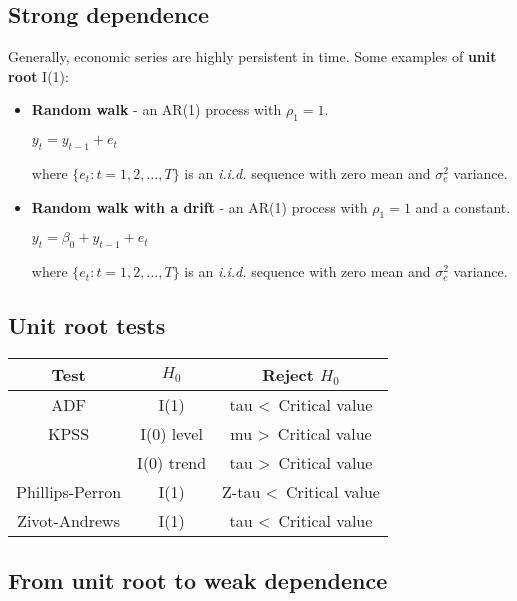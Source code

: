 \documentclass[10pt, a4paper, landscape]{article}
\begin{document}
\begin{multicols}{3}
\subsection*{Strong dependence}

Generally, economic series are highly persistent in time. Some examples of \textbf{unit root} I(1):

\begin{itemize}[leftmargin=*]
	\item \textbf{Random walk} - an AR(1) process with \( \rho_{1} = 1 \).
	\begin{center}
		\( y_{t} = y_{t - 1} + e_{t} \)
	\end{center}
	where \( \{ e_{t} : t = 1, 2, \ldots, T \} \) is an \textsl{i.i.d.} sequence with zero mean and \( \sigma_{e}^{2} \) variance.
	\item \textbf{Random walk with a drift} - an AR(1) process with \( \rho_{1} = 1 \) and a constant.
	\begin{center}
		\( y_{t} = \beta_{0} + y_{t - 1} + e_{t} \)
	\end{center}
	where \( \{ e_{t} : t = 1, 2, \ldots, T \} \) is an \textsl{i.i.d.} sequence with zero mean and \( \sigma_{e}^{2} \) variance.
\end{itemize}

\subsection*{Unit root tests}

\begin{center}
	\begin{tabular}{ c | c | c }
		Test            & \( H_{0} \) & Reject \( H_{0} \)                 \\ \hline
		ADF             & I(1)        & tau \textless \, Critical value    \\ \hline
		KPSS            & I(0) level  & mu \textgreater \, Critical value  \\
		                & I(0) trend  & tau \textgreater \, Critical value \\ \hline
		Phillips-Perron & I(1)        & Z-tau \textless \, Critical value  \\ \hline
		Zivot-Andrews   & I(1)        & tau \textless \, Critical value
	\end{tabular}
\end{center}

\subsection*{From unit root to weak dependence}


\end{multicols}
\end{document}
